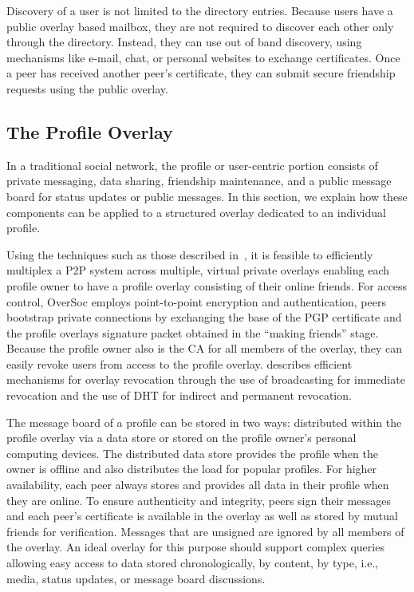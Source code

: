 \documentclass{sig-alternate}
\begin{document}
Discovery of a user is not limited to the directory entries.  Because users
have a public overlay based mailbox, they are not required to discover each
other only through the directory.  Instead, they can use out of band discovery,
using mechanisms like e-mail, chat, or personal websites to exchange
certificates.  Once a peer has received another peer's certificate, they can
submit secure friendship requests using the public overlay.

\subsection{The Profile Overlay}
\label{profile_overlay}

In a traditional social network, the profile or user-centric portion consists
of private messaging, data sharing, friendship maintenance, and a public
message board for status updates or public messages.  In this section, we
explain how these components can be applied to a structured overlay dedicated
to an individual profile.

Using the techniques such as those described in~\cite{vpo}, it is feasible to
efficiently multiplex a P2P system across multiple, virtual private overlays
enabling each profile owner to have a profile overlay consisting of their
online friends.  For access control, OverSoc employs point-to-point encryption
and authentication, peers bootstrap private connections by exchanging the base
of the PGP certificate and the profile overlays signature packet obtained in
the ``making friends'' stage.  Because the profile owner also is the CA for all
members of the overlay, they can easily revoke users from access to the profile
overlay.  \cite{vpo} describes efficient mechanisms for overlay revocation
through the use of broadcasting for immediate revocation and the use of DHT for
indirect and permanent revocation.

The message board of a profile can be stored in two ways: distributed within
the profile overlay via a data store or stored on the profile owner's personal
computing devices.  The distributed data store provides the profile when the
owner is offline and also distributes the load for popular profiles.  For
higher availability, each peer always stores and provides all data in their
profile when they are online.  To ensure authenticity and integrity, peers sign
their messages and each peer's certificate is available in the overlay as well
as stored by mutual friends for verification.  Messages that are unsigned are
ignored by all members of the overlay.  An ideal overlay for this purpose
should support complex queries~\cite{complex_queries} allowing easy access to
data stored chronologically, by content, by type, i.e., media, status updates,
or message board discussions.
\end{document}
